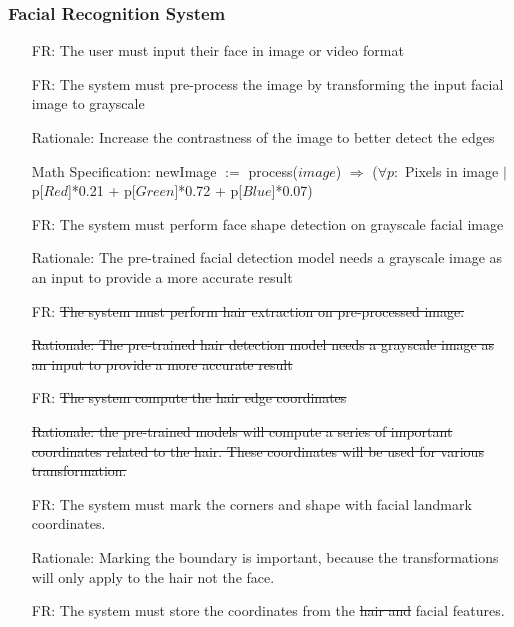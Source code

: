 \documentclass[12pt]{article}
\newcounter{reqnum} %
\newcounter{frreqnum} %
\begin{document}
\subsubsection{Facial Recognition System}
    \begin{itemize}
        \item[FR\refstepcounter{frreqnum}\thefrreqnum \label{R_Inputs}:] The user must input their face in image or video format
        \item[FR\refstepcounter{frreqnum}\thefrreqnum \label{R_Inputs}:] The system must pre-process the image by transforming the input facial image to grayscale
        \item[] Rationale: Increase the contrastness of the image to better detect the edges
        \item[] Math Specification: newImage $:=$ process($image$) $\Rightarrow$ ($\forall p :$ Pixels in image $|$ p[$Red$]*0.21 + p[$Green$]*0.72 + p[$Blue$]*0.07)
        \item[FR\refstepcounter{frreqnum}\thefrreqnum \label{R_Inputs}:] The system must perform face shape detection on grayscale facial image
        \item[] Rationale: The pre-trained facial detection model needs a grayscale image as an input to provide a more accurate result
        \item[FR\refstepcounter{frreqnum}\thefrreqnum \label{R_Inputs}:] \sout{The system must perform hair extraction on pre-processed image.}
        \item[] \sout{Rationale: The pre-trained hair detection model needs a grayscale image as an input to provide a more accurate result}
        \item[FR\refstepcounter{frreqnum}\thefrreqnum \label{R_Inputs}:] \sout{The system compute the hair edge coordinates}
        \item[] \sout{Rationale: the pre-trained models will compute a series of important coordinates related to the hair. These coordinates will be used for various transformation.}
        \item[FR\refstepcounter{frreqnum}\thefrreqnum \label{R_Inputs}:] The system must mark the corners and shape with facial landmark coordinates.
        \item[] Rationale: Marking the boundary is important, because the transformations will only apply to the hair not the face.
        \item[FR\refstepcounter{frreqnum}\thefrreqnum \label{R_Inputs}:] The system must store the coordinates from the \sout{hair and} facial features.
    \end{itemize}
\end{document}
